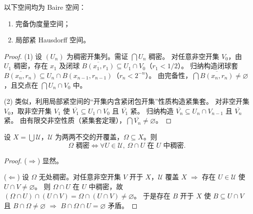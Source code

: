 \documentclass[lang=cn,a4paper,newtx,figureplace=section,tableplace=section]{elegantbook}
\begin{document}
\begin{theorem}\label{thm:baire-category-theorem}
  以下空间均为 Baire 空间：
  \begin{enumerate}[(1)]
    \item 完备伪度量空间；
    \item 局部紧 Hausdorff 空间。
  \end{enumerate}
\end{theorem}
\begin{proof}
  (1) 设 $(U_n)$ 为稠密开集列。需证 $\bigcap U_n$ 稠密。
  对任意非空开集 $V_0$，由 $U_1$ 稠密，存在 $x_1$ 及闭球 $\overline{B(x_1, r_1)} \subseteq U_1 \cap V_0$（$r_1 < 1/2$）。
  归纳构造闭球套 $\overline{B(x_n, r_n)} \subseteq U_n \cap B(x_{n-1}, r_{n-1})$（$r_n < 2^{-n}$）。
  由完备性，$\bigcap \overline{B(x_n, r_n)} \neq \varnothing$，且交点在 $\bigcap U_n \cap V_0$ 中。
  
  (2) 类似，利用局部紧空间的“开集内含紧闭包开集”性质构造紧集套。
  对非空开集 $V_0$，取非空开集 $V_1$ 使 $\overline{V_1} \subseteq U_1 \cap V_0$ 且 $\overline{V_1}$ 紧。
  归纳构造 $\overline{V_n} \subseteq U_n \cap V_{n-1}$ 且 $\overline{V_n}$ 紧。
  由有限交非空性质（紧集套定理），$\bigcap \overline{V_n} \neq \varnothing$。
\end{proof}

\begin{lemma}\label{lem:dense-in-open-cover}
  设 $X=\bigcup\mathcal U$，$\mathcal U$ 为两两不交的开覆盖，$\Omega\subseteq X$。则
  \[
    \Omega\text{ 稠密}\Leftrightarrow\forall U\in\mathcal U,\ \Omega\cap U\text{ 在 }U\text{ 中稠密}.
  \]
\end{lemma}
\begin{proof}
  ($\Rightarrow$) 显然。

  ($\Leftarrow$) 设 $\Omega$ 无处稠密。对任意非空开集 $V$ 开于 $X$，$\mathcal U$ 覆盖 $X$ $\Rightarrow$ 存在 $U\in\mathcal U$ 使 $U\cap V\neq\varnothing$。
  则 $\Omega\cap U$ 在 $U$ 中稠密，故 $(\Omega\cap U)\cap(U\cap V)=\Omega\cap(U\cap V)\neq\varnothing$。
  于是存在 $B$ 开于 $X$ 使 $B\subseteq U\cap V$ 且 $B\cap\Omega\neq\varnothing$ $\Rightarrow$ $B\cap\Omega\cap U=\varnothing$ 矛盾。
\end{proof}
\end{document}
